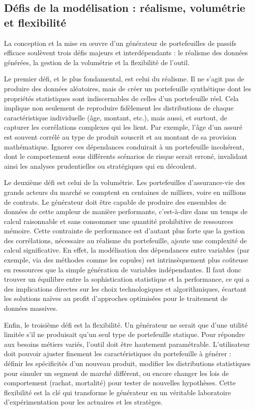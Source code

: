 \subsection{Défis de la modélisation : réalisme, volumétrie et flexibilité}

La conception et la mise en œuvre d'un générateur de portefeuilles de passifs efficace soulèvent trois défis majeurs et interdépendants : le réalisme des données générées, la gestion de la volumétrie et la flexibilité de l'outil.

Le premier défi, et le plus fondamental, est celui du réalisme. Il ne s'agit pas de produire des données aléatoires, mais de créer un portefeuille synthétique dont les propriétés statistiques sont indiscernables de celles d'un portefeuille réel. Cela implique non seulement de reproduire fidèlement les distributions de chaque caractéristique individuelle (âge, montant, etc.), mais aussi, et surtout, de capturer les corrélations complexes qui les lient. Par exemple, l'âge d'un assuré est souvent corrélé au type de produit souscrit et au montant de sa provision mathématique. Ignorer ces dépendances conduirait à un portefeuille incohérent, dont le comportement sous différents scénarios de risque serait erroné, invalidant ainsi les analyses prudentielles ou stratégiques qui en découlent.

Le deuxième défi est celui de la volumétrie. Les portefeuilles d'assurance-vie des grands acteurs du marché se comptent en centaines de milliers, voire en millions de contrats. Le générateur doit être capable de produire des ensembles de données de cette ampleur de manière performante, c'est-à-dire dans un temps de calcul raisonnable et sans consommer une quantité prohibitive de ressources mémoire. Cette contrainte de performance est d'autant plus forte que la gestion des corrélations, nécessaire au réalisme du portefeuille, ajoute une complexité de calcul significative. En effet, la modélisation des dépendances entre variables (par exemple, via des méthodes comme les copules) est intrinsèquement plus coûteuse en ressources que la simple génération de variables indépendantes. Il faut donc trouver un équilibre entre la sophistication statistique et la performance, ce qui a des implications directes sur les choix technologiques et algorithmiques, écartant les solutions naïves au profit d'approches optimisées pour le traitement de données massives.

Enfin, le troisième défi est la flexibilité. Un générateur ne serait que d'une utilité limitée s'il ne produisait qu'un seul type de portefeuille statique. Pour répondre aux besoins métiers variés, l'outil doit être hautement paramétrable. L'utilisateur doit pouvoir ajuster finement les caractéristiques du portefeuille à générer : définir les spécificités d'un nouveau produit, modifier les distributions statistiques pour simuler un segment de marché différent, ou encore changer les lois de comportement (rachat, mortalité) pour tester de nouvelles hypothèses. Cette flexibilité est la clé qui transforme le générateur en un véritable laboratoire d'expérimentation pour les actuaires et les stratèges.


